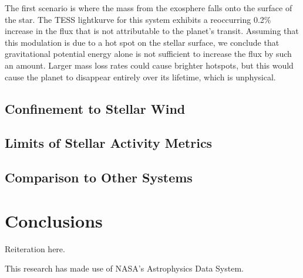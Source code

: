 \documentclass[twocolumn]{aastex631}
\begin{document}
The first scenario is where the mass from the exosphere falls onto the surface of the star. The TESS lightkurve for this system exhibits a reoccurring 0.2\% increase in the flux that is not attributable to the planet’s transit. Assuming that this modulation is due to a hot spot on the stellar surface, we conclude that gravitational potential energy alone is not sufficient to increase the flux by such an amount. Larger mass loss rates could cause brighter hotspots, but this would cause the planet to disappear entirely over its lifetime, which is unphysical.

\subsection{Confinement to Stellar Wind}
\subsection{Limits of Stellar Activity Metrics}
\subsection{Comparison to Other Systems}
\section{Conclusions}

Reiteration here.

\clearpage
\pagebreak


\appendix


\begin{acknowledgements}
    This research has made use of NASA's Astrophysics Data System.
\end{acknowledgements}




\clearpage



\end{document}
